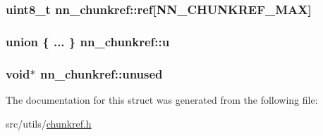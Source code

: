 \subsubsection[{ref}]{\setlength{\rightskip}{0pt plus 5cm}uint8\+\_\+t nn\+\_\+chunkref\+::ref\mbox{[}{\bf N\+N\+\_\+\+C\+H\+U\+N\+K\+R\+E\+F\+\_\+\+M\+AX}\mbox{]}}\hypertarget{structnn__chunkref_a0fc4f3dc4f5b28d6f309d903d7d9ab38}{}\label{structnn__chunkref_a0fc4f3dc4f5b28d6f309d903d7d9ab38}
\subsubsection[{u}]{\setlength{\rightskip}{0pt plus 5cm}union \{ ... \}   nn\+\_\+chunkref\+::u}\hypertarget{structnn__chunkref_a4152ee1b9cc806576ba19b302d585d83}{}\label{structnn__chunkref_a4152ee1b9cc806576ba19b302d585d83}
\subsubsection[{unused}]{\setlength{\rightskip}{0pt plus 5cm}void$\ast$ nn\+\_\+chunkref\+::unused}\hypertarget{structnn__chunkref_a0481e23ecc1944c53854b5d1f424640b}{}\label{structnn__chunkref_a0481e23ecc1944c53854b5d1f424640b}


The documentation for this struct was generated from the following file\+:\begin{DoxyCompactItemize}
\item 
src/utils/\hyperlink{chunkref_8h}{chunkref.\+h}\end{DoxyCompactItemize}

